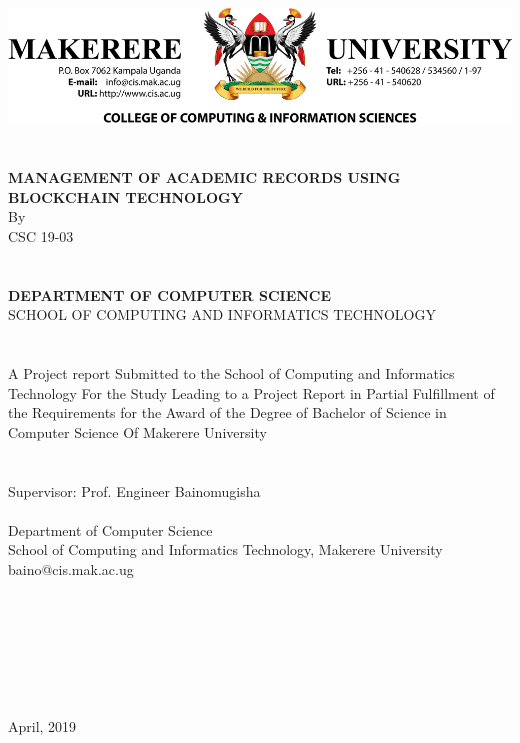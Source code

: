 \begin{titlepage}
\begin{center}

		\includegraphics[scale=1.0]{images/muklogo.png} \\~\\~\\
		
\textbf{MANAGEMENT OF ACADEMIC RECORDS USING BLOCKCHAIN TECHNOLOGY}\\
By \\ 
CSC 19-03\\~\\~\\
\textbf{DEPARTMENT OF COMPUTER SCIENCE}\\
\normalsize{SCHOOL OF COMPUTING AND INFORMATICS TECHNOLOGY}\\~\\~\\
A Project report Submitted to the School of Computing and Informatics Technology
For the Study Leading to a Project Report in Partial Fulfillment of the
Requirements for the Award of the Degree of Bachelor of Science in Computer Science 
Of Makerere University\\~\\~\\
Supervisor: Prof. Engineer Bainomugisha\\~\\

Department of Computer Science\\
School of Computing and Informatics Technology, Makerere University\\
baino@cis.mak.ac.ug\\~\\~\\~\\~\\~\\~\\~\\
April, 2019


\end{center}


\end{titlepage}